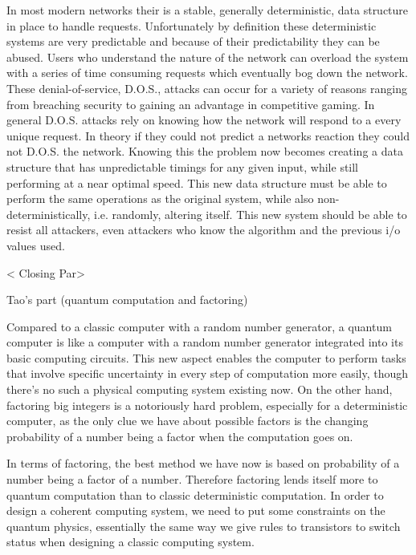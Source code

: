 \documentclass{paper}
\begin{document}
In most modern networks their is a stable, generally deterministic, data structure in place to handle requests. Unfortunately by definition these deterministic systems are very predictable and because of their predictability they can be abused. Users who understand the nature of the network can overload the system with a series of time consuming requests which eventually bog down the network. These denial-of-service, D.O.S., attacks can occur for a variety of reasons ranging from breaching security to gaining an advantage in competitive gaming. In general D.O.S. attacks rely on knowing how the network will respond to a every unique request. In theory if they could not predict a networks reaction they could not D.O.S. the network. Knowing this the problem now becomes creating a data structure that has unpredictable timings for any given input, while still performing at a near optimal speed. This new data structure must be able to perform the same operations as the original system, while also non-deterministically, i.e. randomly, altering itself. This new system should be able to resist all attackers, even attackers who know the algorithm and the previous i/o values used. 
\newline\newline

< Closing Par>

 Tao's part (quantum computation and factoring)



Compared to a classic computer with a random number generator, a quantum computer is like a computer with a random number generator integrated into its basic computing circuits. This new aspect enables the computer to perform tasks that involve specific uncertainty in every step of computation more easily, though there's no such a physical computing system existing now. On the other hand, factoring big integers is a notoriously hard problem, especially for a deterministic computer, as the only clue we have about possible factors is the changing probability of a number being a factor when the computation goes on.


In terms of factoring, the best method we have now is based on probability of a number being a factor of a number. Therefore factoring lends itself more to quantum computation than to classic deterministic computation. In order to design a coherent computing system, we need to put some constraints on the quantum physics, essentially the same way we give rules to transistors to switch status when designing a classic computing system.
\end{document}
